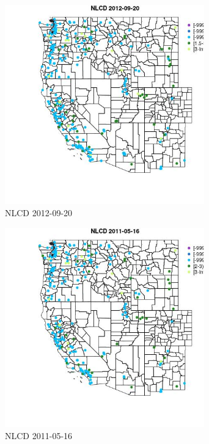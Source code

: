 \begin{figure} 
\centering  
\includegraphics[width=0.77\textwidth]{Code_Outputs/ML_input_report_ML_input_PM25_Step5_part_d_de_duplicated_aves_ML_input_MapObsNLCD2012-09-20.jpg} 
\caption{\label{fig:ML_input_report_ML_input_PM25_Step5_part_d_de_duplicated_aves_ML_inputMapObsNLCD2012-09-20}NLCD 2012-09-20} 
\end{figure} 
 

\begin{figure} 
\centering  
\includegraphics[width=0.77\textwidth]{Code_Outputs/ML_input_report_ML_input_PM25_Step5_part_d_de_duplicated_aves_ML_input_MapObsNLCD2011-05-16.jpg} 
\caption{\label{fig:ML_input_report_ML_input_PM25_Step5_part_d_de_duplicated_aves_ML_inputMapObsNLCD2011-05-16}NLCD 2011-05-16} 
\end{figure} 
 


